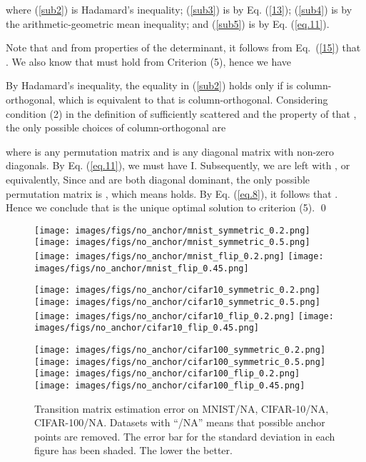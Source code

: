 \documentclass{article}
\begin{document}
where (\ref{sub2}) is Hadamard's inequality; (\ref{sub3}) is by Eq. (\ref{13}); (\ref{sub4}) is by the arithmetic-geometric mean inequality; and (\ref{sub5}) is by Eq. (\ref{eq.11}). 

Note that  and  from properties of the determinant, it follows from Eq.~(\ref{15}) that . We also know that  must hold from Criterion (5), hence we have 


By Hadamard's inequality, the equality in (\ref{sub2}) holds only if  is column-orthogonal, which is equivalent to that  is column-orthogonal. Considering condition (2) in the definition of sufficiently scattered and the property of  that , the only possible choices of column-orthogonal  are



where  is any permutation matrix and 
is any diagonal matrix with non-zero diagonals. By Eq. (\ref{eq.11}), we must have  I. Subsequently, we are left with , or equivalently,  Since  and  are both diagonal dominant, the only possible permutation matrix is , which means  holds. By Eq. (\ref{eq.8}), it follows that . Hence we conclude that   is the unique optimal solution to criterion (5).  \qed

  \begin{figure*}
    
     \texttt{[image: images/figs/no\_anchor/mnist\_symmetric\_0.2.png]}
     \texttt{[image: images/figs/no\_anchor/mnist\_symmetric\_0.5.png]}   
     \texttt{[image: images/figs/no\_anchor/mnist\_flip\_0.2.png]}
     \texttt{[image: images/figs/no\_anchor/mnist\_flip\_0.45.png]}
     \vspace{5mm}

     \texttt{[image: images/figs/no\_anchor/cifar10\_symmetric\_0.2.png]}
     \texttt{[image: images/figs/no\_anchor/cifar10\_symmetric\_0.5.png]}
     \texttt{[image: images/figs/no\_anchor/cifar10\_flip\_0.2.png]}
     \texttt{[image: images/figs/no\_anchor/cifar10\_flip\_0.45.png]}
     
     \vspace{5mm}

     \texttt{[image: images/figs/no\_anchor/cifar100\_symmetric\_0.2.png]}
     \texttt{[image: images/figs/no\_anchor/cifar100\_symmetric\_0.5.png]}
     \texttt{[image: images/figs/no\_anchor/cifar100\_flip\_0.2.png]}
     \texttt{[image: images/figs/no\_anchor/cifar100\_flip\_0.45.png]}
    
     \caption{Transition matrix estimation error on MNIST/NA, CIFAR-10/NA, CIFAR-100/NA. Datasets with ``/NA'' means that possible anchor points are removed. The error bar for the standard deviation in each figure has been shaded. The lower the better.}
     \label{fig:na_est_error}
 \end{figure*}
\end{document}
